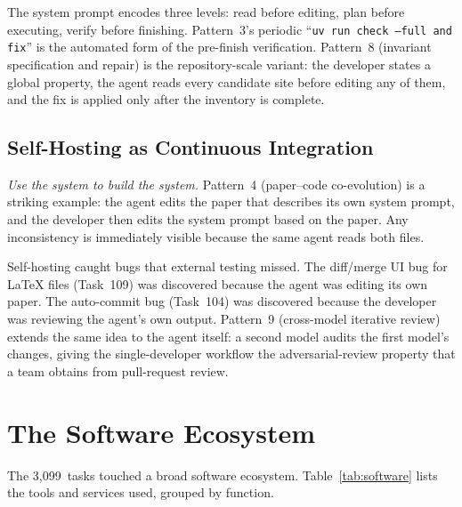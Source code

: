 \documentclass{article}
\begin{document}
The system prompt encodes three levels: read before editing,
plan before executing, verify before finishing.
Pattern~3's periodic ``\texttt{uv run check --full and fix}''
is the automated form of the pre-finish verification.
Pattern~8 (invariant specification and repair) is the
repository-scale variant: the developer states a global property,
the agent reads every candidate site before editing any of them,
and the fix is applied only after the inventory is complete.

\subsection{Self-Hosting as Continuous Integration}
\label{sec:self-hosting}

\emph{Use the system to build the system.}
Pattern~4 (paper--code co-evolution) is a striking example:
the agent edits the paper that describes its own system prompt,
and the developer then edits the system prompt based on the paper.
Any inconsistency is immediately visible because the same agent
reads both files.

Self-hosting caught bugs that external testing missed.
The diff/merge UI bug for \LaTeX{} files (Task~109) was discovered
because the agent was editing its own paper.
The auto-commit bug (Task~104) was discovered because the developer
was reviewing the agent's own output.
Pattern~9 (cross-model iterative review) extends the same idea to
the agent itself: a second model audits the first model's changes,
giving the single-developer workflow the adversarial-review property
that a team obtains from pull-request review.

\section{The Software Ecosystem}
\label{sec:software}

The 3,099~tasks touched a broad software ecosystem.
Table~\ref{tab:software} lists the tools and services used,
grouped by function.
\end{document}
